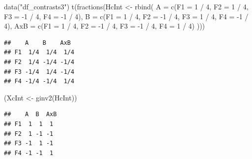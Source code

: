 \documentclass[
  12pt,
]{krantz}
\newenvironment{Shaded}{\begin{snugshade}}{\end{snugshade}}
\newcommand{\AttributeTok}[1]{\textcolor[rgb]{0.77,0.63,0.00}{#1}}
\newcommand{\DecValTok}[1]{\textcolor[rgb]{0.00,0.00,0.81}{#1}}
\newcommand{\FunctionTok}[1]{\textcolor[rgb]{0.00,0.00,0.00}{#1}}
\newcommand{\NormalTok}[1]{#1}
\newcommand{\OtherTok}[1]{\textcolor[rgb]{0.56,0.35,0.01}{#1}}
\newcommand{\SpecialCharTok}[1]{\textcolor[rgb]{0.00,0.00,0.00}{#1}}
\newcommand{\StringTok}[1]{\textcolor[rgb]{0.31,0.60,0.02}{#1}}
\theoremstyle{definition}
\theoremstyle{definition}
\theoremstyle{definition}
\theoremstyle{definition}
\theoremstyle{remark}
\begin{document}
\begin{Shaded}
\begin{Highlighting}[]
\FunctionTok{data}\NormalTok{(}\StringTok{"df\_contrasts3"}\NormalTok{)}
\FunctionTok{t}\NormalTok{(}\FunctionTok{fractions}\NormalTok{(HcInt }\OtherTok{\textless{}{-}} \FunctionTok{rbind}\NormalTok{(}
  \AttributeTok{A =} \FunctionTok{c}\NormalTok{(}\AttributeTok{F1 =} \DecValTok{1} \SpecialCharTok{/} \DecValTok{4}\NormalTok{, }\AttributeTok{F2 =} \DecValTok{1} \SpecialCharTok{/} \DecValTok{4}\NormalTok{, }\AttributeTok{F3 =} \SpecialCharTok{{-}}\DecValTok{1} \SpecialCharTok{/} \DecValTok{4}\NormalTok{, }\AttributeTok{F4 =} \SpecialCharTok{{-}}\DecValTok{1} \SpecialCharTok{/} \DecValTok{4}\NormalTok{),}
  \AttributeTok{B =} \FunctionTok{c}\NormalTok{(}\AttributeTok{F1 =} \DecValTok{1} \SpecialCharTok{/} \DecValTok{4}\NormalTok{, }\AttributeTok{F2 =} \SpecialCharTok{{-}}\DecValTok{1} \SpecialCharTok{/} \DecValTok{4}\NormalTok{, }\AttributeTok{F3 =} \DecValTok{1} \SpecialCharTok{/} \DecValTok{4}\NormalTok{, }\AttributeTok{F4 =} \SpecialCharTok{{-}}\DecValTok{1} \SpecialCharTok{/} \DecValTok{4}\NormalTok{),}
  \AttributeTok{AxB =} \FunctionTok{c}\NormalTok{(}\AttributeTok{F1 =} \DecValTok{1} \SpecialCharTok{/} \DecValTok{4}\NormalTok{, }\AttributeTok{F2 =} \SpecialCharTok{{-}}\DecValTok{1} \SpecialCharTok{/} \DecValTok{4}\NormalTok{, }\AttributeTok{F3 =} \SpecialCharTok{{-}}\DecValTok{1} \SpecialCharTok{/} \DecValTok{4}\NormalTok{, }\AttributeTok{F4 =} \DecValTok{1} \SpecialCharTok{/} \DecValTok{4}\NormalTok{)}
\NormalTok{)))}
\end{Highlighting}
\end{Shaded}

\begin{verbatim}
##    A    B    AxB 
## F1  1/4  1/4  1/4
## F2  1/4 -1/4 -1/4
## F3 -1/4  1/4 -1/4
## F4 -1/4 -1/4  1/4
\end{verbatim}

\begin{Shaded}
\begin{Highlighting}[]
\NormalTok{(XcInt }\OtherTok{\textless{}{-}} \FunctionTok{ginv2}\NormalTok{(HcInt))}
\end{Highlighting}
\end{Shaded}

\begin{verbatim}
##    A  B  AxB
## F1  1  1  1 
## F2  1 -1 -1 
## F3 -1  1 -1 
## F4 -1 -1  1
\end{verbatim}

\begin{Shaded}
\end{Shaded}
\end{document}
